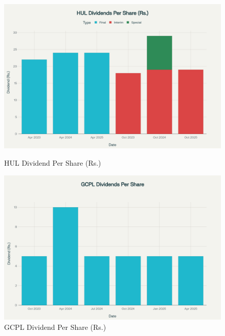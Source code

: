 \documentclass[12pt, a4paper]{report}
\begin{document}
\begin{figure}[H]
    \centering
    \begin{minipage}{0.48\textwidth}
        \centering
        \includegraphics[width=\textwidth]{assets/Dividend_Payout_HUL.png}
        \caption{HUL Dividend Per Share (Rs.)}
    \end{minipage}
    \hfill
    \begin{minipage}{0.48\textwidth}
        \centering
        \includegraphics[width=\textwidth]{assets/Dividend_Payout_GCPL.png}
        \caption{GCPL Dividend Per Share (Rs.)}
    \end{minipage}
\end{figure}

\vspace{0.5cm}
\end{document}
